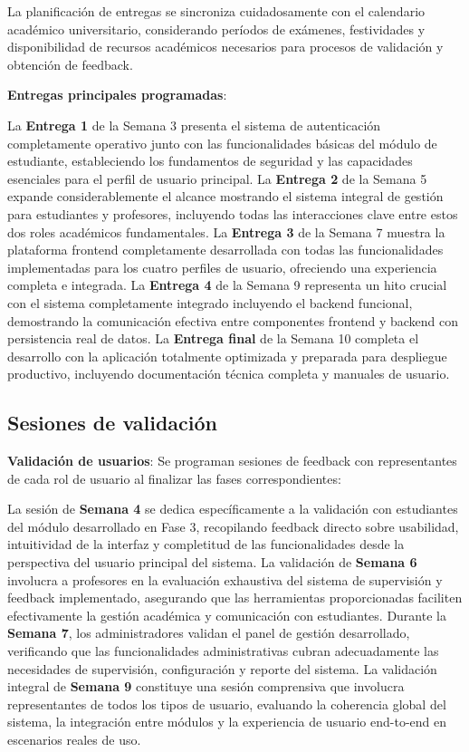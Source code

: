 \documentclass[12pt,a4paper,oneside]{report}
\begin{document}
La planificación de entregas se sincroniza cuidadosamente con el calendario académico universitario, considerando períodos de exámenes, festividades y disponibilidad de recursos académicos necesarios para procesos de validación y obtención de feedback.

\textbf{Entregas principales programadas}:

La \textbf{Entrega 1} de la Semana 3 presenta el sistema de autenticación completamente operativo junto con las funcionalidades básicas del módulo de estudiante, estableciendo los fundamentos de seguridad y las capacidades esenciales para el perfil de usuario principal. La \textbf{Entrega 2} de la Semana 5 expande considerablemente el alcance mostrando el sistema integral de gestión para estudiantes y profesores, incluyendo todas las interacciones clave entre estos dos roles académicos fundamentales. La \textbf{Entrega 3} de la Semana 7 muestra la plataforma frontend completamente desarrollada con todas las funcionalidades implementadas para los cuatro perfiles de usuario, ofreciendo una experiencia completa e integrada. La \textbf{Entrega 4} de la Semana 9 representa un hito crucial con el sistema completamente integrado incluyendo el backend funcional, demostrando la comunicación efectiva entre componentes frontend y backend con persistencia real de datos. La \textbf{Entrega final} de la Semana 10 completa el desarrollo con la aplicación totalmente optimizada y preparada para despliegue productivo, incluyendo documentación técnica completa y manuales de usuario.

\subsection{Sesiones de validación}\label{sesiones-de-validaciuxf3n}

\textbf{Validación de usuarios}: Se programan sesiones de feedback con
representantes de cada rol de usuario al finalizar las fases
correspondientes:

La sesión de \textbf{Semana 4} se dedica específicamente a la validación con estudiantes del módulo desarrollado en Fase 3, recopilando feedback directo sobre usabilidad, intuitividad de la interfaz y completitud de las funcionalidades desde la perspectiva del usuario principal del sistema. La validación de \textbf{Semana 6} involucra a profesores en la evaluación exhaustiva del sistema de supervisión y feedback implementado, asegurando que las herramientas proporcionadas faciliten efectivamente la gestión académica y comunicación con estudiantes. Durante la \textbf{Semana 7}, los administradores validan el panel de gestión desarrollado, verificando que las funcionalidades administrativas cubran adecuadamente las necesidades de supervisión, configuración y reporte del sistema. La validación integral de \textbf{Semana 9} constituye una sesión comprensiva que involucra representantes de todos los tipos de usuario, evaluando la coherencia global del sistema, la integración entre módulos y la experiencia de usuario end-to-end en escenarios reales de uso.
\end{document}
